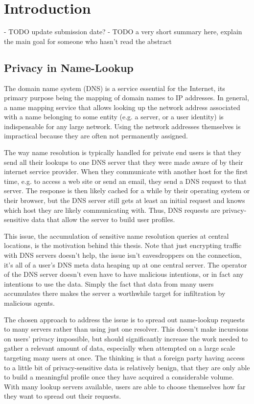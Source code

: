 \chapter{Introduction}
- TODO update submission date?
- TODO a very short summary here, explain the main goal for someone who hasn't
  read the abstract

\section{Privacy in Name-Lookup}
The domain name system (DNS) is a service essential for the Internet, its
primary purpose being the mapping of domain names to IP addresses. In general, a
name mapping service that allows looking up the network address associated with
a name belonging to some entity (e.g. a server, or a user identity) is
indispensable for any large network. Using the network addresses themselves is
impractical because they are often not permanently assigned.

The way name resolution is typically handled for private end users is that they
send all their lookups to one DNS server that they were made aware of by their
internet service provider. When they communicate with another host for the first
time, e.g. to access a web site or send an email, they send a DNS request to
that server. The response is then likely cached for a while by their
operating system or their browser, but the DNS server still gets at least an
initial request and knows which host they are likely communicating with. Thus,
DNS requests are privacy-sensitive data that allow the server to build user
profiles.

This issue, the accumulation of sensitive name resolution queries at central
locations, is the motivation behind this thesis. Note that just encrypting
traffic with DNS servers doesn't help, the issue isn't eavesdroppers on the
connection, it's all of a user's DNS meta data heaping up at one central server.
The operator of the DNS server doesn't even have to have malicious intentions,
or in fact any intentions to use the data. Simply the fact that data from many
users accumulates there makes the server a worthwhile target for infiltration by
malicious agents.

The chosen approach to address the issue is to spread out name-lookup requests
to many servers rather than using just one resolver. This doesn't make
incursions on users' privacy impossible, but should significantly increase the
work needed to gather a relevant amount of data, especially when attempted on a
large scale targeting many users at once. The thinking is that a foreign party
having access to a little bit of privacy-sensitive data is relatively benign,
that they are only able to build a meaningful profile once they have acquired a
considerable volume. With many lookup servers available, users are able to
choose themselves how far they want to spread out their requests.


